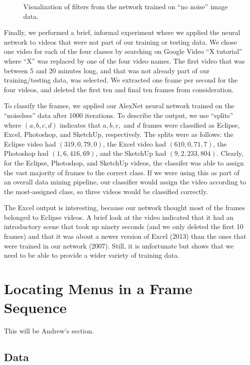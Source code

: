\documentclass[10pt]{article}
\begin{document}
\begin{figure}[t]
\begin{minipage}{.4\textwidth}
  \caption{Visualization of filters from the network trained on ``no noise'' image data.}
  \label{fig:filters_nonoise}
  \end{minipage}
\end{figure}

Finally, we performed a brief, informal experiment where we applied the neural network to videos that
were not part of our training or testing data. We chose one video for each of the four classes by
searching on Google Video ``X tutorial'' where ``X'' was replaced by one of the four video names.
The first video that was between 5 and 20 minutes long, and that was not already part of our
training/testing data, was selected. We extracted one frame per second for the four videos, and
deleted the first ten and final ten frames from consideration.

To classify the frames, we applied our AlexNet neural network trained on the ``noiseless'' data
after 1000 iterations. To describe the output, we use ``splits'' where $(a,b,c,d)$ indicates that
$a, b, c,$ and $d$ frames were classified as Eclipse, Excel, Photoshop, and SketchUp, respectively.
The splits were as follows: the Eclipse video had $(319,0,79,0)$, the Excel video had
$(610,0,71,7)$, the Photoshop had $(1,6,416,69)$, and the SketchUp had $(9,2,233,804)$. Clearly, for
the Eclipse, Photoshop, and SketchUp videos, the classifer was able to assign the vast majority of
frames to the correct class. If we were using this as part of an overall data mining pipeline, our
classifier would assign the video according to the most-assigned class, so three videos would be
classified correctly.

The Excel output is interesting, because our network thought most of the frames belonged to Eclipse
videos. A brief look at the video indicated that it had an introductory scene that took up ninety
seconds (and we only deleted the first 10 frames) and that it was about a newer version of Excel
(2013) than the ones that were trained in our network (2007). Still, it is unfortunate but shows
that we need to be able to provide a wider variety of training data.

\section{Locating Menus in a Frame Sequence}

This will be Andrew's section.

\subsection{Data}
\end{document}

